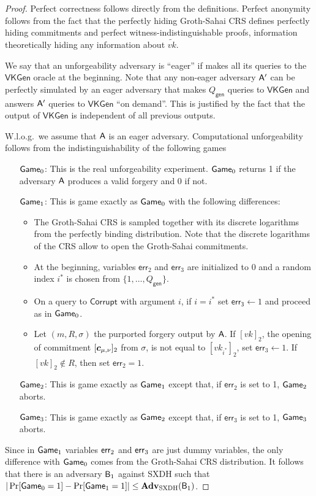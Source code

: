 \begin{proof}
Perfect correctness follows directly from the definitions. Perfect anonymity follows from the fact that the perfectly hiding Groth-Sahai CRS defines perfectly hiding commitments and perfect witness-indistinguishable proofs, information theoretically hiding any information about $\tilde{vk}$.

We say that an unforgeability adversary is ``eager'' if  makes all its queries to the $\mathsf{VKGen}$ oracle at the beginning. Note that any non-eager adversary $\mathsf{A}'$ can be perfectly simulated  by an eager adversary that makes ${Q_\mathsf{gen}}$ queries to $\mathsf{VKGen}$ and answers $\mathsf{A}'$ queries to $\mathsf{VKGen}$ ``on demand''. This is justified by the fact that the output of $\mathsf{VKGen}$ is independent of all previous outputs.

W.l.o.g.~we assume that $\mathsf{A}$ is an eager adversary. Computational unforgeability follows from the indistinguishability of the following games
\begin{itemize}
\item[$\mathsf{Game}_0$:] This is the real unforgeability experiment. $\mathsf{Game}_0$ returns 1 if the adversary $\mathsf{A}$ produces a valid forgery and 0 if not.
\item[$\mathsf{Game}_1$:] This is game exactly as $\mathsf{Game}_0$ with the following differences: 
    \begin{itemize}
    \item The Groth-Sahai CRS is sampled together with its discrete logarithms from the perfectly binding distribution. Note that the discrete logarithms of the CRS allow to open the Groth-Sahai commitments.
    \item At the beginning, variables $\mathsf{err}_2$ and $\mathsf{err}_3$ are initialized to $0$ and a random index $i^*$ is chosen from $\{1,\ldots, Q_\mathsf{gen}\}$.
    \item On a query to $\mathsf{Corrupt}$ with argument $i$, if $i=i^*$ set $\mathsf{err_3}\gets 1$ and proceed as in $\mathsf{Game}_0$.
    \item Let $(m,R,\sigma)$ the purported forgery output by $\mathsf{A}$. If $[vk]_2$, the opening of commitment $[{\boldsymbol{c}}_{\mu,\nu}]_2$ from $\sigma$, is not equal to $[vk_{i^*}]_2$,  set $\mathsf{err}_3\gets 1$. If $[vk]_2\notin R$, then set $\mathsf{err}_2=1$.
    \end{itemize}
\item[$\mathsf{Game}_2$:] This is game exactly as $\mathsf{Game}_1$ except that, if $\mathsf{err}_2$ is set to 1, $\mathsf{Game}_2$ aborts.
\item[$\mathsf{Game}_3$:] This is game exactly as $\mathsf{Game}_2$ except that, if $\mathsf{err}_3$ is set to 1, $\mathsf{Game}_3$ aborts. 
\end{itemize}
Since in $\mathsf{Game}_1$ variables $\mathsf{err}_2$ and $\mathsf{err}_3$ are just dummy variables, the only difference with $\mathsf{Game}_0$ comes from the Groth-Sahai CRS distribution. It follows that there is an adversary $\mathsf{B}_{1}$ against SXDH such that $|\Pr[\mathsf{Game}_0=1]-\Pr[\mathsf{Game}_1=1]|\leq \mathbf{Adv}_{\mathrm{SXDH}}(\mathsf{B}_{1})$.


\end{proof}
